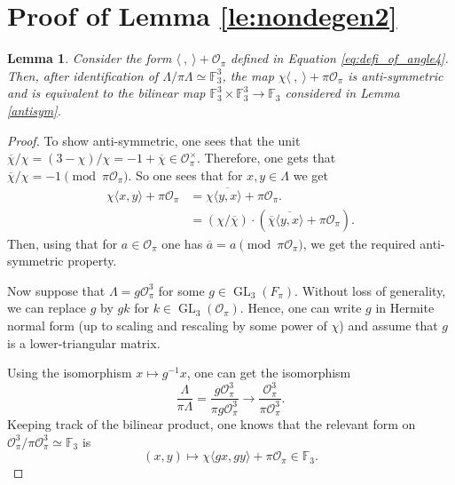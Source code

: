 \documentclass{eptcs}
\newtheorem{lemma}[theorem]{Lemma}
\theoremstyle{remark}
\theoremstyle{definition}
\DeclareMathOperator{\GL}{GL}
\begin{document}
\section{Proof of Lemma \ref{le:nondegen2}}
\label{proofofprop5.19}
\begin{lemma}
  \label{le:nondegen2repeat}
  Consider the form $\langle \ , \ \rangle + \mathcal{O}_{\pi}$ defined in 
  Equation \ref{eq:defi_of_angle4}. Then, after identification of $\Lambda / \pi \Lambda \simeq \mathbb{F}_{3}^{3}$, the map $\chi \langle \ , \ \rangle + \pi \mathcal{O}_{\pi}$ is anti-symmetric and is equivalent to the bilinear map $\mathbb{F}_{3}^{3} \times \mathbb{F}_{3}^{3} \rightarrow  \mathbb{F}_{3}$ considered in Lemma \ref{antisym}.
\end{lemma}
\begin{proof}
    To show anti-symmetric, one sees that the unit $\overline{\chi}/\chi = (3-\chi)/\chi = -1 + \overline{\chi} \in \mathcal{O}_{\pi}^{\times}$.
    Therefore, one gets that $\overline{\chi}/\chi  = -1 \pmod{ \pi \mathcal{O}_{\pi}}$. So one sees that for $x,y \in \Lambda$ 
    we get 
    \begin{align}
	\chi \langle x, y \rangle + \pi \mathcal{O}_{\pi}  & =  \chi \overline{\langle y, x \rangle } + \pi \mathcal{O}_{\pi}. \\
							   & =  ({\chi}/{\overline{\chi}}) \cdot \left( \overline{\chi} 
\overline{\langle y, x \rangle } + \pi \mathcal{O}_{\pi} \right).
    \end{align}
    Then, using that for $a \in \mathcal{O}_{\pi}$ one has $\overline{a} = a \pmod{\pi \mathcal{O}_{\pi}}$, we get the required anti-symmetric property.

    Now suppose that $\Lambda = g \mathcal{O}_{\pi}^{3}$ for some $g \in \GL_{3}({F}_{\pi})$. 
Without loss of generality, we can replace $g$ by $gk$ for $k \in \GL_{3}(\mathcal{O}_{\pi})$. 
Hence, one can write $g$ in Hermite normal form (up to scaling and rescaling by some power of $\chi$) 
and assume that $g$ is a lower-triangular matrix.
    
Using the isomorphism $x \mapsto  g^{-1}x$, one can get the isomorphism
    \begin{equation}
	\frac{\Lambda}{\pi \Lambda} = \frac{g \mathcal{O}_{\pi}^{3}}{ \pi g \mathcal{O}_{\pi}^{3}} \rightarrow    \frac{\mathcal{O}_{\pi}^{3} }{\pi \mathcal{O}_{\pi}^{3}}.
    \end{equation}
    Keeping track of the bilinear product, one knows that the relevant form on $\mathcal{O}_{\pi}^{3} / \pi \mathcal{O}_{\pi}^{3} \simeq \mathbb{F}_{3}$ is 
    \begin{equation}
	(x,y) \mapsto  \chi \langle g x, gy \rangle + \pi \mathcal{O}_{\pi} \in \mathbb{F}_{3}.
    \end{equation}


\end{proof}
\end{document}
